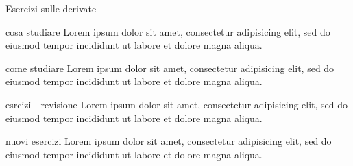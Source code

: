 \documentclass[aspectratio=169]{beamer}
\begin{document}
\begin{frame}[t]{Esercizi sulle derivate}

\begin{alertblock}{cosa studiare} \vspace{2pt}
Lorem ipsum dolor sit amet, consectetur adipisicing elit, 
sed do eiusmod tempor incididunt ut labore et 
dolore magna aliqua.
\end{alertblock}

\begin{alertblock}{come studiare} \vspace{2pt}
Lorem ipsum dolor sit amet, consectetur adipisicing elit, 
sed do eiusmod tempor incididunt ut labore et 
dolore magna aliqua.
\end{alertblock}

\begin{alertblock}{esrcizi - revisione} \vspace{2pt}
Lorem ipsum dolor sit amet, consectetur adipisicing elit, 
sed do eiusmod tempor incididunt ut labore et 
dolore magna aliqua.
\end{alertblock}

\begin{alertblock}{nuovi esercizi} \vspace{2pt}
Lorem ipsum dolor sit amet, consectetur adipisicing elit, 
sed do eiusmod tempor incididunt ut labore et 
dolore magna aliqua.
\end{alertblock}
\end{frame}
\end{document}
